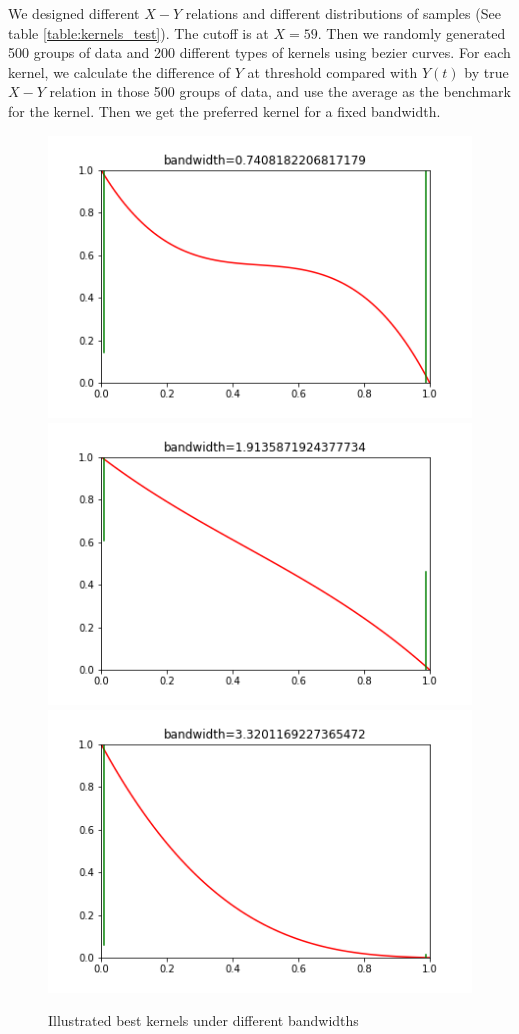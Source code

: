 \documentclass[a4 paper,12pt]{article}
\begin{document}
We designed different $X-Y$ relations and different distributions of samples (See table \ref{table:kernels_test}).
The cutoff is at $X=59$.
Then we randomly generated 500 groups of data and 200 different types of kernels using bezier curves. For each kernel, we calculate the difference of $Y$ at threshold compared with $Y(t)$ by true $X-Y$ relation in those 500 groups of data, and use the average as the benchmark for the kernel.
Then we get the preferred kernel for a fixed bandwidth.

\begin{figure}
   \centering
   \includegraphics[scale=0.3]{case30_frame0000000.png}
   \includegraphics[scale=0.3]{case30_frame0000031.png}
   \includegraphics[scale=0.3]{case30_frame0000049.png}
   \caption{Illustrated best kernels under different bandwidths}
   \label{fig:kernels}
\end{figure}
\end{document}
